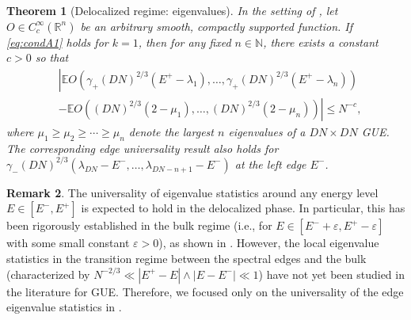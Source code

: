 \documentclass[10pt,reqno]{amsart}
\numberwithin{equation}{section}
\numberwithin{figure}{section}
\theoremstyle{plain} %
\newtheorem{theorem}{Theorem}[section]
\theoremstyle{definition} %
\newtheorem{remark}[theorem]{Remark}
\newcommand{\E}{\mathbb{E}}
\newcommand{\N}{\mathbb{N}}
\renewcommand{\leq}{\le}
\renewcommand{\geq}{\ge}
\newcommand{\pa}[1]{\left({#1}\right)}
\newcommand{\e}{{\varepsilon}}
\numberwithin{equation}{section}
\begin{document}
\begin{theorem}[Delocalized regime: eigenvalues]\label{MixEV}
In the setting of , let $O \in C_c^{\infty}\left(\mathbb{R}^n\right)$ be an arbitrary smooth, compactly supported function. If \eqref{eq:condA1} holds for $k=1$, then for any fixed $n\in \N$, there exists a constant $c>0$ so that 
\begin{align}
 &\left|	\E O\pa{\gamma_+ \pa{D N}^{2/3}\pa{E^+-\lambda_1},\ldots,\gamma_+ \pa{D N}^{2/3}\pa{E^+-\lambda_n}}\right.\nonumber \\
 &\left.-\E O\pa{ \pa{D N}^{2/3}\pa{2-\mu_1},\ldots, \pa{D N}^{2/3}\pa{2-\mu_n}}   \right|\leq N^{-c} ,
\end{align}
where $\mu_1\geq\mu_2\geq\cdots\geq\mu_n$ denote the largest $n$ eigenvalues of a $DN\times DN$ GUE. The corresponding edge universality result also holds for $\gamma_-(DN)^{2/3}(\lambda_{DN}-E^-,\ldots,\lambda_{DN-n+1}-E^- )$ at the left edge $E^-$.
\end{theorem}

\begin{remark}\label{rmk_only_edge}
The universality of eigenvalue statistics around any energy level $E \in [E^-, E^+]$ is expected to hold in the delocalized phase. In particular, this has been rigorously established in the bulk regime (i.e., for $E\in[E^-+\e, E^+-\e]$ with some small constant $\e>0$), as shown in \cite{stone2024randommatrixmodelquantum}. However, the local eigenvalue statistics in the transition regime between the spectral edges and the bulk (characterized by $N^{-2/3}\ll |E^+-E|\wedge |E-E^-|\ll 1$) have not yet been studied in the literature for GUE. Therefore, we focused only on the universality of the edge eigenvalue statistics in .
\end{remark}
\end{document}
